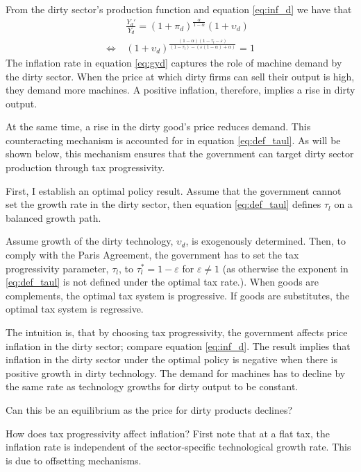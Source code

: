 From the dirty sector's production function and equation \ref{eq:inf_d} we have that
\begin{align}
&\frac{Y_{d}'}{Y_d}=(1+\pi_d)^{\frac{\alpha}{1-\alpha}}(1+\upsilon_{d})\label{eq:gyd}\\
\Leftrightarrow\ &(1+\upsilon_{d})^{\frac{(1-\alpha)(1-\tau_l-\varepsilon)}{(1-\tau_l)-(\varepsilon(1-\alpha)+\alpha)}}=1\label{eq:def_taul}
\end{align}
The inflation rate in equation \ref{eq:gyd} captures the role of machine demand by the dirty sector. When the price at which dirty firms can sell their output is high, they demand more machines. A positive inflation, therefore, implies a rise in dirty output.

At the same time, a rise in the dirty good's price reduces demand. This counteracting mechanism is accounted for in equation \ref{eq:def_taul}. 
 As will be shown below, this mechanism ensures that the government can target dirty sector production through tax progressivity. 

First, I establish an optimal policy result. Assume that the government cannot set the growth rate in the dirty sector, then equation \ref{eq:def_taul} defines $\tau_l$ on a balanced growth path.

\begin{prop}
Assume growth of the dirty technology, $\upsilon_{d}$, is exogenously determined. 
Then, to comply with the Paris Agreement, the government has to set the tax progressivity parameter, $\tau_l$, to $\tau^*_l=1-\varepsilon$ for $\varepsilon\neq 1$ (as otherwise the exponent in \ref{eq:def_taul} is not defined under the optimal tax rate.).
When goods are complements, the optimal tax system is progressive. If goods are substitutes, the optimal tax system is regressive.
\end{prop}

The intuition is, that by choosing tax progressivity, the government affects price inflation in the dirty sector; compare equation \ref{eq:inf_d}. 
The result implies that inflation in the dirty sector under the optimal policy is negative when there is positive growth in dirty technology. The demand for machines has to decline by the same rate as technology growths for dirty output to be constant.  

Can this be an equilibrium as the price for dirty products declines?

How does tax progressivity affect inflation? 
First note that at a flat tax, the inflation rate is independent of the sector-specific technological growth rate. This is due to offsetting mechanisms.

